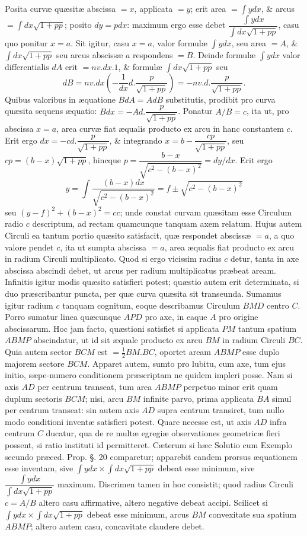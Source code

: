 Posita curvæ quæsitæ abscissa $=x$, applicata $=y$; erit area $=\int ydx$, \& arcus $=\int dx\sqrt{1+pp}$; posito $dy=pdx$: maximum ergo esse debet $\dfrac{\int ydx}{\int dx\sqrt{1+pp}}$, casu quo ponitur $x=a$. Sit igitur, casu $x=a$, valor formulæ $\int ydx$, seu area $=A$, \& $\int dx\sqrt{1+pp}$ seu arcus abscissæ $a$ respondens $=B$. Deinde formulæ $\int ydx$ valor differentialis $dA$ erit $=nv.dx.1$, \& formulæ $\int dx\sqrt{1+pp}$ seu
\[dB=nv.dx\left(-\frac{1}{dx}d.\frac{p}{\sqrt{1+pp}}\right)=-nv.d.\frac{p}{\sqrt{1+pp}}.\]
Quibus valoribus in æquatione $BdA=AdB$ substitutis, prodibit pro curva quæsita sequens æquatio: $Bdx=-Ad.\dfrac{p}{\sqrt{1+pp}}$. Ponatur $A/B=c$, ita ut, pro abscissa $x=a$, area curvæ fiat æqualis producto ex arcu in hanc constantem $c$. Erit ergo $dx=-cd.\dfrac{p}{\sqrt{1+pp}}$, \& integrando $x=b-\dfrac{cp}{\sqrt{1+pp}}$, seu $cp=(b-x)\sqrt{1+pp}$, hincque $p=\dfrac{b-x}{\sqrt{c^2-(b-x)^2}}=dy/dx$. Erit ergo
\[y=\int\frac{(b-x)dx}{\sqrt{c^2-(b-x)^2}}=f\pm\sqrt{c^2-(b-x)^2}\]
seu $(y-f)^2+(b-x)^2=cc$; unde constat curvam quæsitam esse Circulum radio $c$ descriptum, ad rectam quamcunque tanquam axem relatum. Hujus autem Circuli ea tantum portio quæsito satisfacit, quæ respondet abscissæ $=a$, a quo valore pendet $c$, ita ut sumpta abscissa $=a$, area æqualis fiat producto ex arcu in radium Circuli multiplicato. Quod si ergo vicissim radius $c$ detur, tanta in axe abscissa abscindi debet, ut arcus per radium multiplicatus præbeat aream. Infinitis igitur modis quæsito satisfieri potest; quæstio autem erit determinata, si duo præscribantur puncta, per quæ curva quæsita sit transeunda. Sumamus igitur radium $c$ tanquam cognitum, eoque describamus Circulum $BMD$ centro $C$. Porro sumatur linea quæcunque $APD$ pro axe, in eaque $A$ pro origine abscissarum. Hoc jam facto, quæstioni satisfiet si applicata $PM$ tantum spatium $ABMP$ abscindatur, ut id sit æquale producto ex arcu $BM$ in radium Circuli $BC$. Quia autem sector $BCM$ est $=\tfrac12BM.BC$, oportet aream $ABMP$ esse duplo majorem sectore $BCM$. Apparet autem, sumto pro lubitu, cum axe, tum ejus initio, sæpe-numero conditionem præscriptam ne quidem impleri posse. Nam si axis $AD$ per centrum transeat, tum area $ABMP$ perpetuo minor erit quam duplum sectoris $BCM$; nisi, arcu $BM$ infinite parvo, prima applicata $BA$ simul per centrum transeat: sin autem axis $AD$ supra centrum transiret, tum nullo modo conditioni inventæ satisfieri potest. Quare necesse est, ut axis $AD$ infra centrum $C$ ducatur, qua de re multæ egregiæ observationes geometricæ fieri possent, si ratio instituti id permitteret. Cæterum si hæc Solutio cum Exemplo secundo præced. Prop. §. 20 comparetur; apparebit eandem prorsus æquationem esse inventam, sive $\int ydx\times\int dx\sqrt{1+pp}$ debeat esse minimum, sive $\dfrac{\int ydx}{\int dx\sqrt{1+pp}}$ maximum. Discrimen tamen in hoc consistit; quod radius Circuli $c=A/B$ altero casu affirmative, altero negative debeat accipi. Scilicet si $\int ydx\times\int dx\sqrt{1+pp}$ debeat esse minimum, arcus $BM$ convexitate sua spatium $ABMP$; altero autem casu, concavitate claudere debet.
